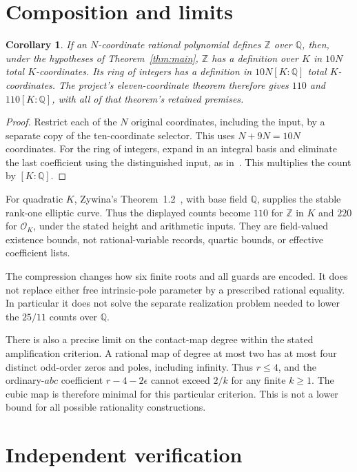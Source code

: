 \documentclass[11pt,a4paper]{article}
\newtheorem{corollary}[theorem]{Corollary}
\newcommand{\Q}{\mathbb Q}\newcommand{\Z}{\mathbb Z}
\begin{document}
\section{Composition and limits}

\begin{corollary}
If an \(N\)-coordinate rational polynomial defines \(\Z\) over \(\Q\),
then, under the hypotheses of Theorem~\ref{thm:main}, \(\Z\) has a
definition over \(K\) in \(10N\) total \(K\)-coordinates.
Its ring of integers has a definition in
\(10N[K:\Q]\) total \(K\)-coordinates.
The project's eleven-coordinate theorem therefore gives \(110\)
and \(110[K:\Q]\), with all of that theorem's retained premises.
\end{corollary}
\begin{proof}
Restrict each of the \(N\) original coordinates, including the input,
by a separate copy of the ten-coordinate selector. This uses
\(N+9N=10N\) coordinates. For the ring of integers, expand in an
integral basis and eliminate the last coefficient using the
distinguished input, as in~\cite{amplified}. This multiplies the count
by \([K:\Q]\).
\end{proof}

For quadratic \(K\), Zywina's Theorem~1.2~\cite{Zywina}, with base
field \(\Q\), supplies the stable rank-one elliptic curve. Thus the
displayed counts become \(110\) for \(\Z\) in \(K\) and \(220\) for
\(\mathcal O_K\), under the stated height and arithmetic inputs.
They are field-valued existence bounds, not rational-variable records,
quartic bounds, or effective coefficient lists.

The compression changes how six finite roots and all guards are encoded.
It does not replace either free intrinsic-pole parameter by a prescribed
rational equality. In particular it does not solve the separate
realization problem needed to lower the \(25/11\) counts over \(\Q\).

There is also a precise limit on the contact-map degree within the
stated amplification criterion. A rational map of degree at most two
has at most four distinct odd-order zeros and poles, including infinity.
Thus \(r\le4\), and the ordinary-\(abc\) coefficient
\(r-4-2\epsilon\) cannot exceed \(2/k\) for any finite \(k\ge1\).
The cubic map is therefore minimal for this particular criterion.
This is not a lower bound for all possible rationality constructions.

\section{Independent verification}
\end{document}
